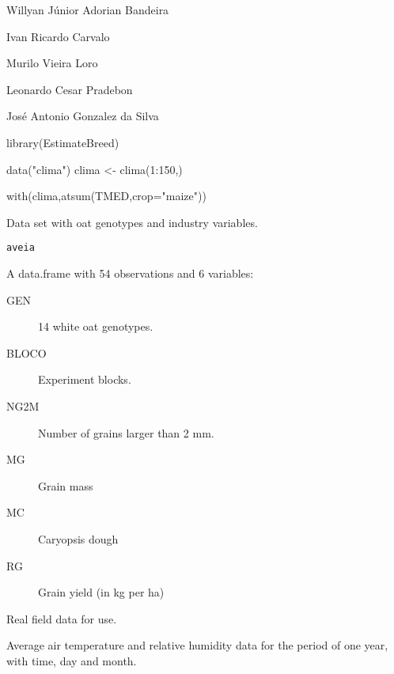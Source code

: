 \documentclass[a4paper]{book}
\begin{document}
%
\begin{Author}
Willyan Júnior Adorian Bandeira

Ivan Ricardo Carvalo

Murilo Vieira Loro

Leonardo Cesar Pradebon

José Antonio Gonzalez da Silva
\end{Author}
%
\begin{Examples}
\begin{ExampleCode}

library(EstimateBreed)

data("clima")
clima <- clima(1:150,)

with(clima,atsum(TMED,crop="maize"))

\end{ExampleCode}
\end{Examples}
%
\begin{Description}
Data set with oat genotypes and industry variables.
\end{Description}
%
\begin{Usage}
\begin{verbatim}
aveia
\end{verbatim}
\end{Usage}
%
\begin{Format}
A data.frame with 54 observations and 6 variables:
\begin{description}

\item[GEN] 14 white oat genotypes.
\item[BLOCO] Experiment blocks.
\item[NG2M] Number of grains larger than 2 mm.
\item[MG] Grain mass
\item[MC] Caryopsis dough
\item[RG] Grain yield (in kg per ha)

\end{description}

\end{Format}
%
\begin{Source}
Real field data for use.
\end{Source}
%
\begin{Description}
Average air temperature and relative humidity data for the period of
one year, with time, day and month.
\end{Description}
\end{document}
